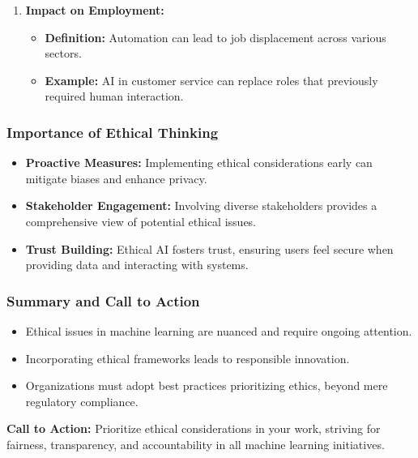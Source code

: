 \documentclass[aspectratio=169]{beamer}
\begin{document}
\begin{frame}[fragile]
\begin{enumerate}
        \item \textbf{Impact on Employment:}
        \begin{itemize}
            \item \textbf{Definition:} Automation can lead to job displacement across various sectors.
            \item \textbf{Example:} AI in customer service can replace roles that previously required human interaction.
        \end{itemize}
    \end{enumerate}
\end{frame}

\begin{frame}[fragile]
    \frametitle{Importance of Ethical Thinking}
    \begin{itemize}
        \item \textbf{Proactive Measures:} Implementing ethical considerations early can mitigate biases and enhance privacy.
        \item \textbf{Stakeholder Engagement:} Involving diverse stakeholders provides a comprehensive view of potential ethical issues.
        \item \textbf{Trust Building:} Ethical AI fosters trust, ensuring users feel secure when providing data and interacting with systems.
    \end{itemize}
\end{frame}

\begin{frame}[fragile]
    \frametitle{Summary and Call to Action}
    \begin{itemize}
        \item Ethical issues in machine learning are nuanced and require ongoing attention.
        \item Incorporating ethical frameworks leads to responsible innovation.
        \item Organizations must adopt best practices prioritizing ethics, beyond mere regulatory compliance.
    \end{itemize}
    \vspace{1em}
    \textbf{Call to Action:} Prioritize ethical considerations in your work, striving for fairness, transparency, and accountability in all machine learning initiatives.
\end{frame}
\end{document}
